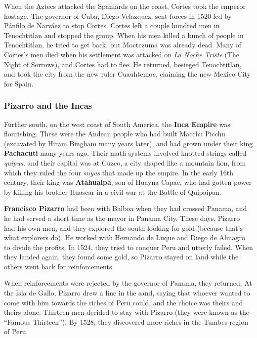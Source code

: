 When the Aztecs attacked the Spaniards on the coast, Cortes took the emperor hostage.
The governor of Cuba, Diego Velazquez,
sent forces in 1520 led by P\'anfilo de Narv\'aez to stop Cortes.
Cortes left a couple hundred men in Tenochtitlan and stopped the group.
When his men killed a bunch of people in Tenochtitlan,
he tried to get back, but Moctezuma was already dead.
Many of Cortes's men died
when his settlement was attacked on \textit{La Noche Triste} (The Night of Sorrows),
and Cortes had to flee.
He returned, besieged Tenochtitlan, and took the city from the new ruler Cuauhtemoc,
claiming the new Mexico City for Spain.

\subsubsection*{Pizarro and the Incas}

Further south, on the west coast of South America, the \textbf{Inca Empire} was flourishing.
These were the Andean people who had built Macchu Picchu
(excavated by Hiram Bingham many years later),
and had grown under their king \textbf{Pachacuti} many years ago.
Their math systems involved knotted strings called \textit{quipus},
and their capital was at Cuzco, a city shaped like a mountain lion,
from which they ruled the four \textit{suyus} that made up the empire.
In the early 16th century, their king was \textbf{Atahualpa}, son of Huayna Capac,
who had gotten power by killing his brother Huascar in a civil war at the Battle of Quipaipan.

\textbf{Francisco Pizarro} had been with Balboa when they had crossed Panama,
and he had served a short time as the mayor in Panama City.
These days, Pizarro had his own men, and they explored the south looking for gold
(because that's what explorers do).
He worked with Hernando de Luque and Diego de Almagro to divide the profits.
In 1524, they tried to conquer Peru and utterly failed.
When they landed again, they found some gold,
so Pizarro stayed on land while the others went back for reinforcements.

When reinforcements were rejected by the governor of Panama, they returned.
At the Isla de Gallo, Pizarro drew a line in the sand,
saying that whoever wanted to come with him towards the riches of Peru could,
and the choice was theirs and theirs alone.
Thirteen men decided to stay with Pizarro (they were known as the ``Famous Thirteen'').
By 1528, they discovered more riches in the Tumbes region of Peru.

